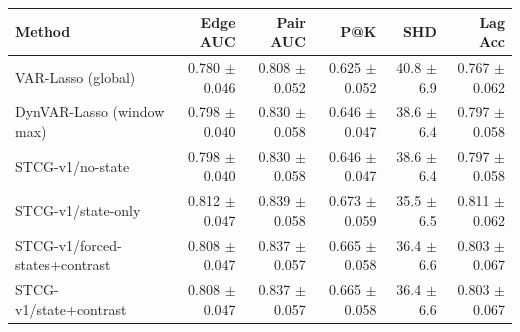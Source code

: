 \begin{tabular}{lrrrrr}
\toprule
Method & Edge AUC & Pair AUC & P@K & SHD & Lag Acc \\
\midrule
VAR-Lasso (global) & 0.780 $\pm$ 0.046 & 0.808 $\pm$ 0.052 & 0.625 $\pm$ 0.052 & 40.8 $\pm$ 6.9 & 0.767 $\pm$ 0.062 \\
DynVAR-Lasso (window max) & 0.798 $\pm$ 0.040 & 0.830 $\pm$ 0.058 & 0.646 $\pm$ 0.047 & 38.6 $\pm$ 6.4 & 0.797 $\pm$ 0.058 \\
STCG-v1/no-state & 0.798 $\pm$ 0.040 & 0.830 $\pm$ 0.058 & 0.646 $\pm$ 0.047 & 38.6 $\pm$ 6.4 & 0.797 $\pm$ 0.058 \\
STCG-v1/state-only & 0.812 $\pm$ 0.047 & 0.839 $\pm$ 0.058 & 0.673 $\pm$ 0.059 & 35.5 $\pm$ 6.5 & 0.811 $\pm$ 0.062 \\
STCG-v1/forced-states+contrast & 0.808 $\pm$ 0.047 & 0.837 $\pm$ 0.057 & 0.665 $\pm$ 0.058 & 36.4 $\pm$ 6.6 & 0.803 $\pm$ 0.067 \\
STCG-v1/state+contrast & 0.808 $\pm$ 0.047 & 0.837 $\pm$ 0.057 & 0.665 $\pm$ 0.058 & 36.4 $\pm$ 6.6 & 0.803 $\pm$ 0.067 \\
\bottomrule
\end{tabular}
